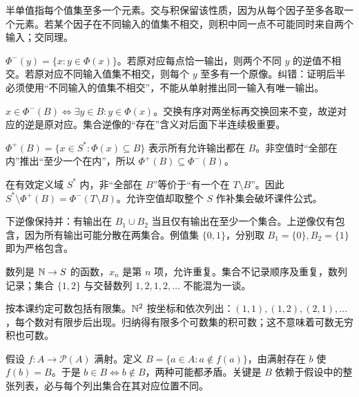半单值指每个值集至多一个元素。交与积保留该性质，因为从每个因子至多各取一个元素。若某个因子在不同输入的值集不相交，则积中同一点不可能同时来自两个输入；交同理。

$\Phi^{-}(y)=\{x:y\in\Phi(x)\}$。若原对应每点恰一输出，则两个不同 $y$ 的逆值不相交。若原对应不同输入值集不相交，则每个 $y$ 至多有一个原像。纠错：证明后半必须使用“不同输入的值集不相交”，不能从单射推出同一输入有唯一输出。

$x\in\Phi^{-}(B)\iff\exists y\in B:y\in\Phi(x)$。交换有序对两坐标再交换回来不变，故逆对应的逆是原对应。集合逆像的“存在”含义对后面下半连续极重要。

$\Phi^+(B)=\{x\in S^*:\Phi(x)\subseteq B\}$ 表示所有允许输出都在 $B$。非空值时“全部在内”推出“至少一个在内”，所以 $\Phi^+(B)\subseteq\Phi^-(B)$。

在有效定义域 $S^*$ 内，非“全部在 $B$”等价于“有一个在 $T\setminus B$”。因此 $S^*\setminus\Phi^+(B)=\Phi^-(T\setminus B)$。允许空值却取整个 $S$ 作补集会破坏课件公式。

下逆像保持并：有输出在 $B_1\cup B_2$ 当且仅有输出在至少一个集合。上逆像仅有包含，因为所有输出可能分散在两集合。例值集 $\{0,1\}$，分别取 $B_1=\{0\},B_2=\{1\}$ 即为严格包含。

数列是 $\mathbb{N}\to S$ 的函数，$x_n$ 是第 $n$ 项，允许重复。集合不记录顺序及重复，数列记录；集合 $\{1,2\}$ 与交替数列 $1,2,1,2,\ldots$ 不能混为一谈。

按本课约定可数包括有限集。$\mathbb{N}^2$ 按坐标和依次列出：$(1,1),(1,2),(2,1),\ldots$，每个数对有限步后出现。归纳得有限多个可数集的积可数；这不意味着可数无穷积也可数。

假设 $f:A\to\mathcal P(A)$ 满射。定义 $B=\{a\in A:a\notin f(a)\}$，由满射存在 $b$ 使 $f(b)=B$。于是 $b\in B\iff b\notin B$，两种可能都矛盾。关键是 $B$ 依赖于假设中的整张列表，必与每个列出集合在其对应位置不同。
